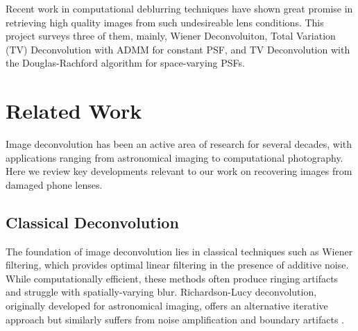 \documentclass[sigconf]{acmart}
\begin{document}
Recent work in computational deblurring techniques have shown great promise in retrieving high quality images from such undesireable lens conditions. This project surveys three of them, mainly, Wiener Deconvoluiton, Total Variation (TV) Deconvolution with ADMM for constant PSF, and TV Deconvolution with the Douglas-Rachford algorithm for space-varying PSFs.



\section{Related Work}
Image deconvolution has been an active area of research for several decades, with applications ranging from astronomical imaging to computational photography. Here we review key developments relevant to our work on recovering images from damaged phone lenses.

\subsection{Classical Deconvolution}
The foundation of image deconvolution lies in classical techniques such as Wiener filtering, which provides optimal linear filtering in the presence of additive noise. While computationally efficient, these methods often produce ringing artifacts and struggle with spatially-varying blur. Richardson-Lucy deconvolution, originally developed for astronomical imaging, offers an alternative iterative approach but similarly suffers from noise amplification and boundary artifacts \cite{Richardson:72}.
\end{document}
